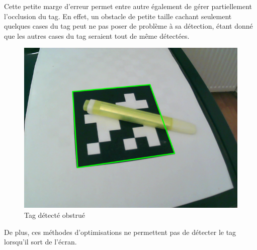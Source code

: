         Cette petite marge d'erreur permet entre autre également de gérer partiellement l'occlusion du tag. En effet, un obstacle de petite taille cachant seulement quelques cases du tag peut ne pas poser de problème à sa détection, étant donné que les autres cases du tag seraient tout de même détectées.

        \begin{figure}[!h]
            \centering
            \includegraphics[scale=0.4]{img/tag_occlusion.png}
            \caption{Tag détecté obstrué}
            \label{fig:tag_occlusion}
        \end{figure}

        De plus, ces méthodes d'optimisations ne permettent pas de détecter le tag lorsqu'il sort de l'écran.
